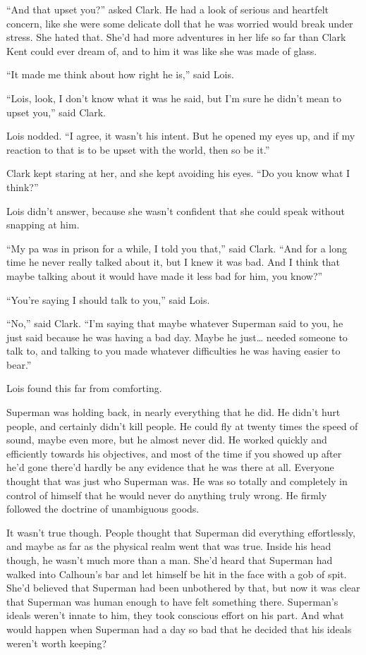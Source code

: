 \documentclass[ebook,12pt]{memoir}
\begin{document}
``And that upset you?'' asked Clark. He had a look of serious and
heartfelt concern, like she were some delicate doll that he was worried
would break under stress. She hated that. She'd had more adventures in
her life so far than Clark Kent could ever dream of, and to him it was
like she was made of glass.

``It made me think about how right he is,'' said Lois.

``Lois, look, I don't know what it was he said, but I'm sure he didn't
mean to upset you,'' said Clark.

Lois nodded. ``I agree, it wasn't his intent. But he opened my eyes up,
and if my reaction to that is to be upset with the world, then so be
it.''

Clark kept staring at her, and she kept avoiding his eyes. ``Do you know
what I think?''

Lois didn't answer, because she wasn't confident that she could speak
without snapping at him.

``My pa was in prison for a while, I told you that,'' said Clark. ``And
for a long time he never really talked about it, but I knew it was bad.
And I think that maybe talking about it would have made it less bad for
him, you know?''

``You're saying I should talk to you,'' said Lois.

``No,'' said Clark. ``I'm saying that maybe whatever Superman said to
you, he just said because he was having a bad day. Maybe he just\ldots{}
needed someone to talk to, and talking to you made whatever difficulties
he was having easier to bear.''

Lois found this far from comforting.

Superman was holding back, in nearly everything that he did. He didn't
hurt people, and certainly didn't kill people. He could fly at twenty
times the speed of sound, maybe even more, but he almost never did. He
worked quickly and efficiently towards his objectives, and most of the
time if you showed up after he'd gone there'd hardly be any evidence
that he was there at all. Everyone thought that was just who Superman
was. He was so totally and completely in control of himself that he
would never do anything truly wrong. He firmly followed the doctrine of
unambiguous goods.

It wasn't true though. People thought that Superman did everything
effortlessly, and maybe as far as the physical realm went that was true.
Inside his head though, he wasn't much more than a man. She'd heard that
Superman had walked into Calhoun's bar and let himself be hit in the
face with a gob of spit. She'd believed that Superman had been
unbothered by that, but now it was clear that Superman was human enough
to have felt something there. Superman's ideals weren't innate to him,
they took conscious effort on his part. And what would happen when
Superman had a day so bad that he decided that his ideals weren't worth
keeping?
\end{document}
